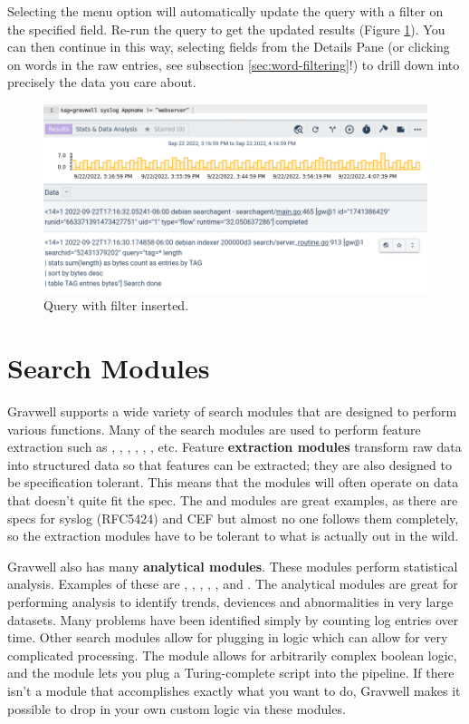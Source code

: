 Selecting the menu option will automatically update the query with a filter on the specified field. Re-run the query to get the updated results (Figure \ref{fig:filtered-query}). You can then continue in this way, selecting fields from the Details Pane (or clicking on words in the raw entries, see subsection \ref{sec:word-filtering}!) to drill down into precisely the data you care about.


\begin{figure}
	\includegraphics[width=0.8\linewidth]{images/filtered-query.png}
	\caption{Query with filter inserted.}
	\label{fig:filtered-query}
\end{figure}

\clearpage
\section{Search Modules}
Gravwell supports a wide variety of search modules that are designed to
perform various functions. Many of the search modules are used to
perform feature extraction such as , , ,
, , , etc. Feature \textbf{extraction modules}
transform raw data into structured data so that features can be
extracted; they are also designed to be specification tolerant. This
means that the modules will often operate on data that doesn't quite fit
the spec. The  and  modules are great examples, as there
are specs for syslog (RFC5424) and CEF but almost no one follows them
completely, so the extraction modules have to be tolerant to what is
actually out in the wild.

Gravwell also has many \textbf{analytical modules}. These modules perform
statistical analysis. Examples of these are , ,
, , , and . The analytical
modules are great for performing analysis to identify
trends, deviences and abnormalities in very large datasets. Many
problems have been identified simply by counting log entries over time.
Other search modules allow for plugging in logic which can allow for
very complicated processing. The  module allows for arbitrarily
complex boolean logic, and the  module lets you plug a
Turing-complete script into the pipeline. If there isn't a module that
accomplishes exactly what you want to do, Gravwell makes it possible to
drop in your own custom logic via these modules.

